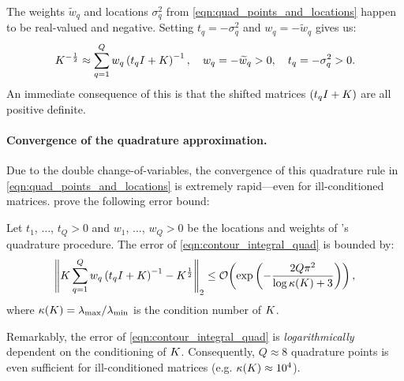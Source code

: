 %
The weights $\widetilde w_q$ and locations $\sigma_q^2$ from \cref{eqn:quad_points_and_locations} happen to be real-valued and negative.
Setting $t_q = -\sigma_q^2$ and $w_q = -\widetilde w_q$ gives us:
%
\begin{equation}
	K^{-\frac 1 2} \approx \sum_{q=1}^Q w_q \left( t_q I + K \right)^{-1}, \quad w_q = -\widetilde w_q > 0, \quad t_q = -\sigma_q^2 > 0.
  \label{eqn:contour_integral_quad_4}
\end{equation}
%
An immediate consequence of this is that the shifted matrices $(t_q I + K)$ are all positive definite.

\paragraph{Convergence of the quadrature approximation.}
Due to the double change-of-variables, the convergence of this quadrature rule in \cref{eqn:quad_points_and_locations} is extremely rapid---even for ill-conditioned matrices.
\citeauthor{hale2008computing} prove the following error bound:
%
\begin{lemma}
  Let $t_1$, $\ldots$, $t_Q > 0$ and $w_1$, $\ldots$, $w_Q > 0$ be the locations and weights of \citeauthor{hale2008computing}'s quadrature procedure.
  The error of \cref{eqn:contour_integral_quad} is bounded by:
  \[
    \left\Vert \bK \sum_{q=1}^Q w_q \left( t_q \bI + \bK \right)^{-1} - \bK^{\frac 1 2} \right\Vert_2
    \leq \bigo{\exp\left( -\frac  {2 Q \pi^2}{\log \kappa(\bK) + 3} \right)},
  \]
  where $\kappa(K) = \lambda_\text{max} / \lambda_\text{min}$ is the condition number of $K$.
\label{lemma:hale}
\end{lemma}
%
Remarkably, the error of \cref{eqn:contour_integral_quad} is \emph{logarithmically} dependent on the conditioning of $K$.
Consequently, $Q\approx8$ quadrature points is even sufficient for ill-conditioned matrices (e.g. $\kappa(K) \approx 10^4$).

